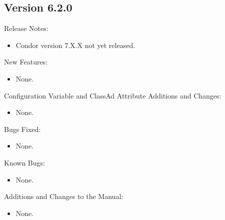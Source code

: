 \subsection*{\label{sec:New-6-2-0}Version 6.2.0}

\noindent Release Notes:

\begin{itemize}

\item Condor version 7.X.X not yet released.

\end{itemize}


\noindent New Features:

\begin{itemize}

\item None.

\end{itemize}

\noindent Configuration Variable and ClassAd Attribute Additions and Changes:

\begin{itemize}

\item None.

\end{itemize}

\noindent Bugs Fixed:

\begin{itemize}

\item None.

\end{itemize}

\noindent Known Bugs:

\begin{itemize}

\item None.

\end{itemize}

\noindent Additions and Changes to the Manual:

\begin{itemize}

\item None.

\end{itemize}


